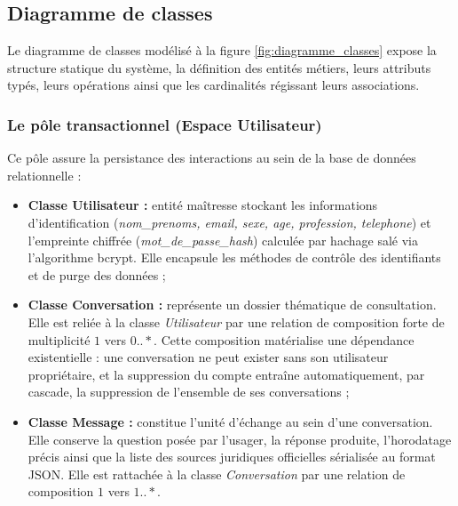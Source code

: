 \subsection{Diagramme de classes}

Le diagramme de classes modélisé à la figure \ref{fig:diagramme_classes} expose la structure statique du système, la définition des entités métiers, leurs attributs typés, leurs opérations ainsi que les cardinalités régissant leurs associations.

\subsubsection{Le pôle transactionnel (Espace Utilisateur)}
Ce pôle assure la persistance des interactions au sein de la base de données relationnelle :
\begin{itemize}
    \item \textbf{Classe Utilisateur :} entité maîtresse stockant les informations d'identification (\textit{nom\_prenoms, email, sexe, age, profession, telephone}) et l'empreinte chiffrée (\textit{mot\_de\_passe\_hash}) calculée par hachage salé via l'algorithme bcrypt. Elle encapsule les méthodes de contrôle des identifiants et de purge des données ;
    
    \item \textbf{Classe Conversation :} représente un dossier thématique de consultation. Elle est reliée à la classe \textit{Utilisateur} par une relation de composition forte de multiplicité $1$ vers $0..*$. Cette composition matérialise une dépendance existentielle : une conversation ne peut exister sans son utilisateur propriétaire, et la suppression du compte entraîne automatiquement, par cascade, la suppression de l'ensemble de ses conversations ;
    
    \item \textbf{Classe Message :} constitue l'unité d'échange au sein d'une conversation. Elle conserve la question posée par l'usager, la réponse produite, l'horodatage précis ainsi que la liste des sources juridiques officielles sérialisée au format JSON. Elle est rattachée à la classe \textit{Conversation} par une relation de composition $1$ vers $1..*$.
\end{itemize}

